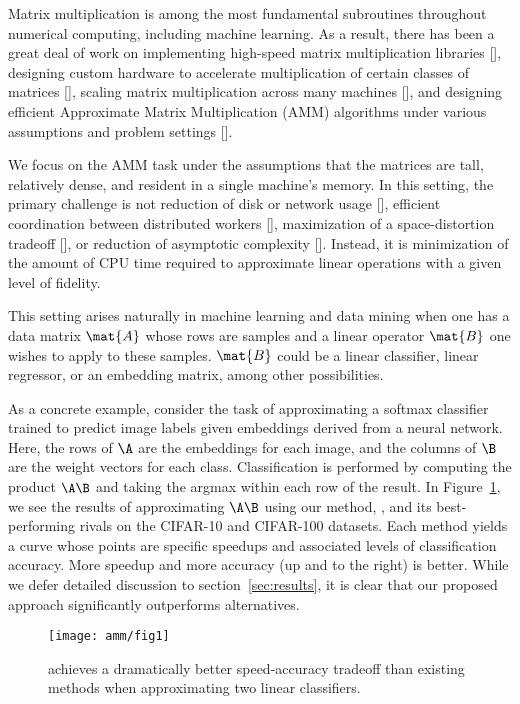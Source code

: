 
Matrix multiplication is among the most fundamental subroutines throughout numerical computing, including machine learning. As a result, there has been a great deal of work on implementing high-speed matrix multiplication libraries [], designing custom hardware to accelerate multiplication of certain classes of matrices [], scaling matrix multiplication across many machines [], and designing efficient Approximate Matrix Multiplication (AMM) algorithms under various assumptions and problem settings [].

We focus on the AMM task under the assumptions that the matrices are tall, relatively dense, and resident in a single machine's memory. In this setting, the primary challenge is not reduction of disk or network usage [], efficient coordination between distributed workers [], maximization of a space-distortion tradeoff [], or reduction of asymptotic complexity []. Instead, it is minimization of the amount of CPU time required to approximate linear operations with a given level of fidelity.

This setting arises naturally in machine learning and data mining when one has a data matrix $\mat{A}$ whose rows are samples and a linear operator $\mat{B}$ one wishes to apply to these samples. $\mat{B}$ could be a linear classifier, linear regressor, or an embedding matrix, among other possibilities.

As a concrete example, consider the task of approximating a softmax classifier trained to predict image labels given embeddings derived from a neural network. Here, the rows of $\A$ are the embeddings for each image, and the columns of $\B$ are the weight vectors for each class. Classification is performed by computing the product $\A\B$ and taking the argmax within each row of the result.
In Figure~\ref{fig:fig1}, we see the results of approximating $\A\B$ using our method, \ours, and its best-performing rivals \cite{hashjl, sparsepca} on the CIFAR-10 and CIFAR-100 datasets. Each method yields a curve whose points are specific speedups and associated levels of classification accuracy. More speedup and more accuracy (up and to the right) is better. While we defer detailed discussion to section~\ref{sec:results}, it is clear that our proposed approach significantly outperforms alternatives.

\vspace{1mm}
\begin{figure}[h]
\begin{center}
\texttt{[image: amm/fig1]}
\caption{\oursp achieves a dramatically better speed-accuracy tradeoff than existing methods when approximating two linear classifiers.}
\label{fig:fig1}
\end{center}
\end{figure}

